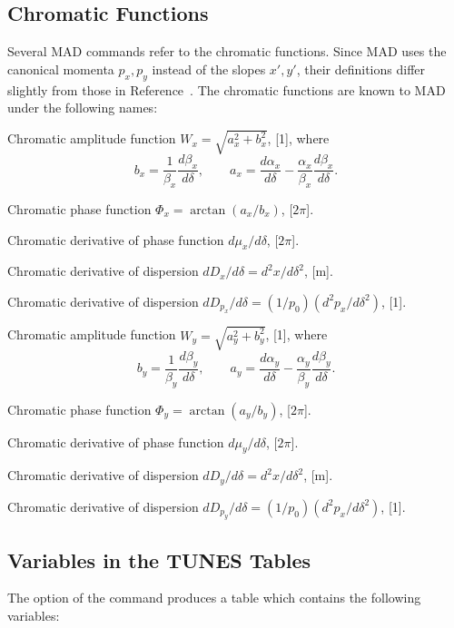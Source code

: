 \subsection{Chromatic Functions}
\label{S-CHROM}
Several MAD commands refer to the chromatic functions.
Since MAD uses the canonical momenta \(p_{x}, p_{y}\)
instead of the slopes \(x', y'\),
their definitions differ slightly from those
in Reference~\cite{B-MON79}.
The chromatic functions are known to MAD under the following names:

\begin{mylist}
Chromatic amplitude function
\(W_{x}=\sqrt{a_{x}^{2}+b_{x}^{2}}\), [1], where
\[
   b_{x}=\frac{1}{\beta_{x}}\frac{d\beta_{x}}{d\delta},
   \qquad
   a_{x}=\frac{d\alpha_{x}}{d\delta}
        -\frac{\alpha_{x}}{\beta_{x}}\frac{d\beta_{x}}{d\delta}.
\]

Chromatic phase function
\(\Phi_{x}=\arctan(a_{x}/b_{x})\), [\(2\pi\)].

Chromatic derivative of phase function
\(d\mu_{x}/d\delta\), [\(2\pi\)].

Chromatic derivative of dispersion
\(dD_{x}/d\delta=d^{2}x/d\delta^{2}\), [m].

Chromatic derivative of dispersion
\(dD_{p_{x}}/d\delta=(1/p_{0})(d^{2}p_{x}/d\delta^{2})\), [1].

Chromatic amplitude function
\(W_{y}=\sqrt{a_{y}^{2}+b_{y}^{2}}\), [1], where
\[
   b_{y}=\frac{1}{\beta_{y}}\frac{d\beta_{y}}{d\delta},
   \qquad
   a_{y}=\frac{d\alpha_{y}}{d\delta}
      -\frac{\alpha_{y}}{\beta_{y}}\frac{d\beta_{y}}{d\delta}.
\]

Chromatic phase function
\(\Phi_{y}=\arctan(a_{y}/b_{y})\), [\(2\pi\)].

Chromatic derivative of phase function
\(d\mu_{y}/d\delta\), [\(2\pi\)].

Chromatic derivative of dispersion
\(dD_{y}/d\delta=d^{2}x/d\delta^{2}\), [m].

Chromatic derivative of dispersion
\(dD_{p_{y}}/d\delta=(1/p_{0})(d^{2}p_{x}/d\delta^{2})\), [1].
\end{mylist}
 
\subsection{Variables in the TUNES Tables}
\label{S-TUNES}
The  option of the  command produces a table
which contains the following variables:

